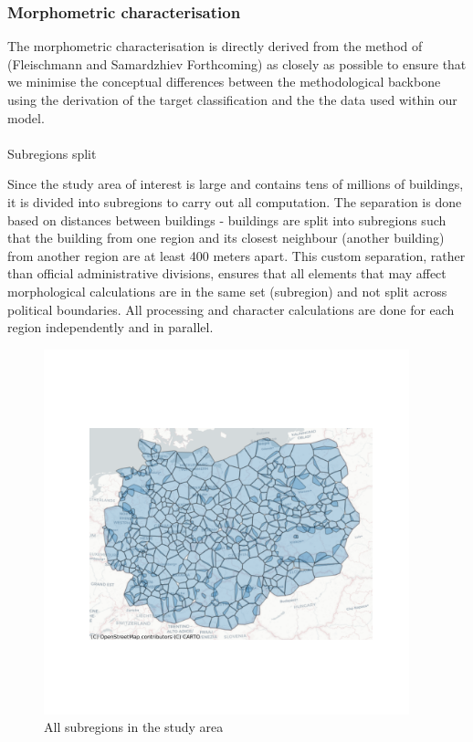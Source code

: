 \documentclass[
  letterpaper,
  DIV=11,
  numbers=noendperiod]{scrartcl}
\makeatletter
\let\oldparagraph\paragraph
\renewcommand{\paragraph}{
    \@ifstar
      \xxxParagraphStar
      \xxxParagraphNoStar
  }
\newcommand{\xxxParagraphStar}[1]{\oldparagraph*{#1}\mbox{}}
\newcommand{\xxxParagraphNoStar}[1]{\oldparagraph{#1}\mbox{}}
\makeatother
\begin{document}
\subsubsection{Morphometric
characterisation}\label{morphometric-characterisation}

The morphometric characterisation is directly derived from the method of
(Fleischmann and Samardzhiev Forthcoming) as closely as possible to
ensure that we minimise the conceptual differences between the
methodological backbone using the derivation of the target
classification and the the data used within our model.

\paragraph{Subregions split}\label{subregions-split}

Since the study area of interest is large and contains tens of millions
of buildings, it is divided into subregions to carry out all
computation. The separation is done based on distances between buildings
- buildings are split into subregions such that the building from one
region and its closest neighbour (another building) from another region
are at least 400 meters apart. This custom separation, rather than
official administrative divisions, ensures that all elements that may
affect morphological calculations are in the same set (subregion) and
not split across political boundaries. All processing and character
calculations are done for each region independently and in parallel.

\begin{figure}[H]

{\centering \includegraphics[width=\linewidth,height=4.16667in,keepaspectratio]{../figures/algo_design/subregions.png}

}

\caption{All subregions in the study area}

\end{figure}%
\end{document}
